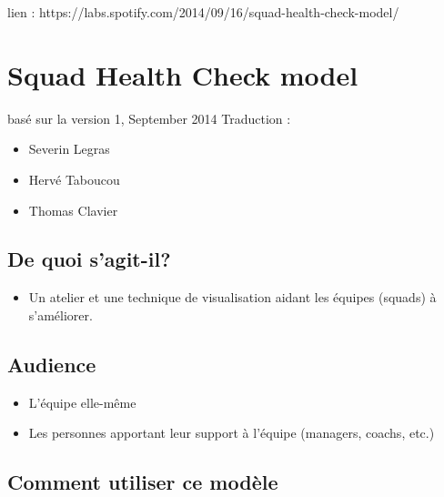 
lien : https://labs.spotify.com/2014/09/16/squad-health-check-model/


\section{Squad Health Check model}

basé sur la version 1, September 2014
Traduction : 
\begin{itemize}
\item Severin Legras
\item Hervé Taboucou
\item Thomas Clavier
\end{itemize}

\subsection{De quoi s'agit-il?}

\begin{itemize}
\item Un atelier et une technique de visualisation aidant les équipes (squads) à s'améliorer.
\end{itemize}

\subsection{Audience}

\begin{itemize}
\item L'équipe elle-même
\item Les personnes apportant leur support à l'équipe (managers, coachs, etc.)
\end{itemize}

\subsection{Comment utiliser ce modèle}

